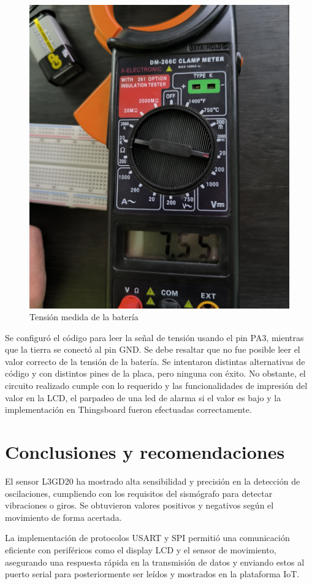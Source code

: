 \documentclass[12pt,a4paper]{article}
\begin{document}
\begin{figure}[H]
    \centering
    \includegraphics[width=0.6\linewidth]{Imagenes/volt.jpg}
    \caption{Tensión medida de la batería}
    \label{fig:5}
\end{figure}

Se configuró el código para leer la señal de tensión usando el pin PA3, mientras que la tierra se conectó al pin GND. Se debe resaltar que no fue posible leer el valor correcto de la tensión de la batería. Se intentaron distintas alternativas de código y con distintos pines de la placa, pero ninguna con éxito. No obstante, el circuito realizado cumple con lo requerido y las funcionalidades de impresión del valor en la LCD, el parpadeo de una led de alarma si el valor es bajo y la implementación en Thingsboard fueron efectuadas correctamente.

\section{Conclusiones y recomendaciones}

El sensor L3GD20 ha mostrado alta sensibilidad y precisión en la detección de oscilaciones, cumpliendo con los requisitos del sismógrafo para detectar vibraciones o giros. Se obtuvieron valores positivos y negativos según el movimiento de forma acertada.

La implementación de protocolos USART y SPI permitió una comunicación eficiente con periféricos como el display LCD y el sensor de movimiento, asegurando una respuesta rápida en la transmisión de datos y enviando estos al puerto serial para posteriormente ser leídos y mostrados en la plataforma IoT.
\end{document}
